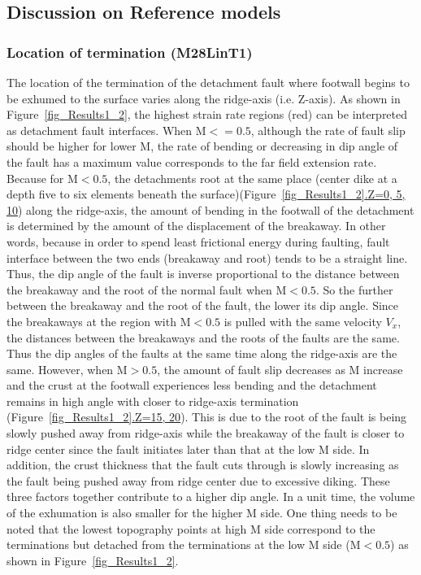\subsection{Discussion on Reference models}
\subsubsection{Location of termination (M28LinT1)}

The location of the termination of the detachment fault where footwall begins to be exhumed to the surface varies along the ridge-axis (i.e. Z-axis). As shown in Figure~\hyperref[fig_Results1_2]{\ref{fig_Results1_2}}, the highest strain rate regions (red) can be interpreted as detachment fault interfaces. When M$<=0.5$, although the rate of fault slip should be higher for lower M, the rate of bending or decreasing in dip angle of the fault has a maximum value corresponds to the far field extension rate. Because for M$<0.5$, the detachments root at the same place (center dike at a depth five to six elements beneath the surface)(Figure~\hyperref[fig_Results1_2]{\ref{fig_Results1_2}.Z=0, 5, 10}) along the ridge-axis, the amount of bending in the footwall of the detachment is determined by the amount of the displacement of the breakaway. In other words, because in order to spend least frictional energy during faulting, fault interface between the two ends (breakaway and root) tends to be a straight line. Thus, the dip angle of the fault is inverse proportional to the distance between the breakaway and the root of the normal fault when M$<0.5$. So the further between the breakaway and the root of the fault, the lower its dip angle. Since the breakaways at the region with M$<0.5$ is pulled with the same velocity $V_{x}$, the distances between the breakaways and the roots of the faults are the same. Thus the dip angles of the faults at the same time along the ridge-axis are the same. However, when M$>0.5$, the amount of fault slip decreases as M increase and the crust at the footwall experiences less bending and the detachment remains in high angle with closer to ridge-axis termination (Figure~\hyperref[fig_Results1_2]{\ref{fig_Results1_2}.Z=15, 20}). This is due to the root of the fault is being slowly pushed away from ridge-axis while the breakaway of the fault is closer to ridge center since the fault initiates later than that at the low M side. In addition, the crust thickness that the fault cuts through is slowly increasing as the fault being pushed away from ridge center due to excessive diking. These three factors together contribute to a higher dip angle. In a unit time, the volume of the exhumation is also smaller for the higher M side. One thing needs to be noted that the lowest topography points at high M side correspond to the terminations but detached from the terminations at the low M side (M$<0.5$) as shown in Figure~\hyperref[fig_Results1_2]{\ref{fig_Results1_2}}.        

